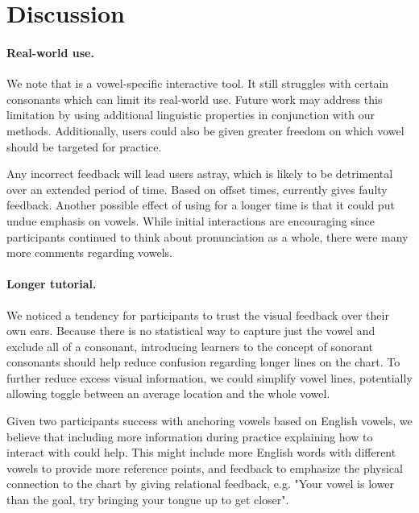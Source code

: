 \section{Discussion}
\paragraph{Real-world use.} We note that \visowel{} is a vowel-specific interactive tool. It still struggles with certain consonants which can limit its real-world use. Future work may address this limitation by using additional linguistic properties in conjunction with our methods. Additionally, users could also be given greater freedom on which vowel should be targeted for practice.

Any incorrect feedback will lead users astray, which is likely to be detrimental over an extended period of time. Based on offset times, \visowel{} currently gives faulty feedback. Another possible effect of using \visowel{} for a longer time is that it could put undue emphasis on vowels. While initial interactions are encouraging since participants continued to think about pronunciation as a whole, there were many more comments regarding vowels. 

\paragraph{Longer tutorial.} 
We noticed a tendency for participants to trust the visual feedback over their own ears. Because there is no statistical way to capture just the vowel and exclude all of a consonant, introducing learners to the concept of sonorant consonants should help reduce confusion regarding longer lines on the chart. To further reduce excess visual information, we could simplify vowel lines, potentially allowing toggle between an average location and the whole vowel.

Given two participants success with anchoring vowels based on English vowels, we believe that including more information during practice explaining how to interact with \visowel{} could help. This might include more English words with different vowels to provide more reference points, and feedback to emphasize the physical connection to the chart by giving relational feedback, e.g. "Your vowel is lower than the goal, try bringing your tongue up to get closer". 

